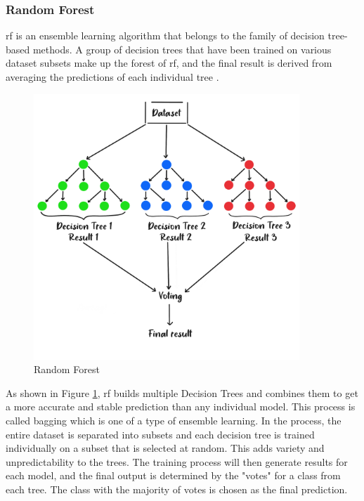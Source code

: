 \subsubsection{Random Forest}
\nocite{er_2021_random}
\nocite{scikitlearn_2018_sklearnensemblerandomforestclassifier}
\nocite{yiu_2019_understanding}
\gls{rf} is an ensemble learning algorithm that belongs to the family of decision tree-based methods.
A group of decision trees that have been trained on various dataset subsets make up the forest of \gls{rf}, and the final result is derived from averaging the predictions of each individual tree \citep{ibm_2023_what}.
\begin{figure}[H]
    \centering
    \includegraphics[width=10cm]{Images/rf.png}
    \caption{Random Forest}
    \label{fig:rf}
\end{figure}
\indent As shown in Figure \ref{fig:rf}, \gls{rf} builds multiple Decision Trees and combines them to get a more accurate and stable prediction than any individual model.
This process is called bagging which is one of a type of ensemble learning. 
In the process, the entire dataset is separated into subsets and each decision tree is trained individually on a subset that is selected at random.
This adds variety and unpredictability to the trees.
The training process will then generate results for each model, and the final output is determined by the "votes" for a class from each tree.
The class with the majority of votes is chosen as the final prediction.
